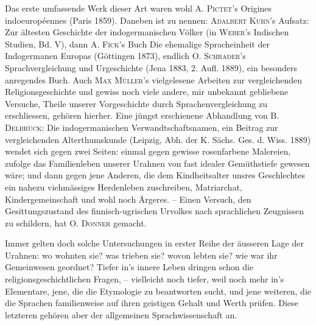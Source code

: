 {Das erste umfassende Werk dieser Art waren wohl A. \textsc{Pictet}’s Origines indoeuropéennes (Paris 1859). Daneben ist zu nennen: \textsc{Adalbert Kuhn}’s Aufsatz: Zur ältesten Geschichte der indogermanischen Völker (in \textsc{Weber}’s Indischen Studien, Bd. V), dann A. \textsc{Fick}’s Buch Die ehemalige Spracheinheit der Indogermanen Europas (Göttingen 1873), endlich O. \textsc{Schrader}’s Sprachvergleichung und Urgeschichte (Jena 1883, 2. Aufl. 1889), ein besonders anregendes Buch. Auch \textsc{Max Müller}’s vielgelesene Arbeiten zur vergleichenden Religionsgeschichte und gewiss noch viele andere, mir unbekannt gebliebene Versuche, Theile unserer Vorgeschichte durch Sprachenvergleichung zu erschliessen, gehören hierher. Eine jüngst erschienene Abhandlung von \textsc{B. Delbrück}: Die indogermanischen Verwandtschaftsnamen, ein Beitrag zur vergleichenden Alterthumskunde (Leipzig, Abh. der K. Sächs. Ges. d. Wiss. 1889) wendet sich gegen zwei Seiten: einmal gegen gewisse rosenfarbene Malereien,  zufolge das Familienleben unserer Urahnen von fast idealer Gemüthstiefe gewesen wäre; und dann gegen jene Anderen, die dem Kindheitsalter unsres Geschlechtes ein nahezu viehmässiges Herdenleben zuschreiben, Matriarchat, Kindergemeinschaft und wohl noch Ärgeres.  – Einen Versuch, den Gesittungszustand des finnisch-ugrischen Urvolkes nach sprachlichen Zeugnissen zu schildern, hat \textsc{O. Donner} gemacht.

\largerpage[-1]
Immer gelten doch solche Untersuchungen in erster Reihe der äusseren Lage der Urahnen: wo wohnten sie? was trieben sie? wovon lebten sie? wie war ihr Gemeinwesen geordnet? Tiefer in’s innere Leben dringen schon die religionsgeschichtlichen Fragen, – vielleicht noch tiefer, weil noch mehr in’s Elementare, jene, die die Etymologie zu beantworten sucht, und jene weiteren, die die Sprachen familienweise auf \label{fp.289} ihren geistigen Gehalt und Werth prüfen. Diese letzteren gehören aber der allgemeinen Sprachwissenschaft an.

}
